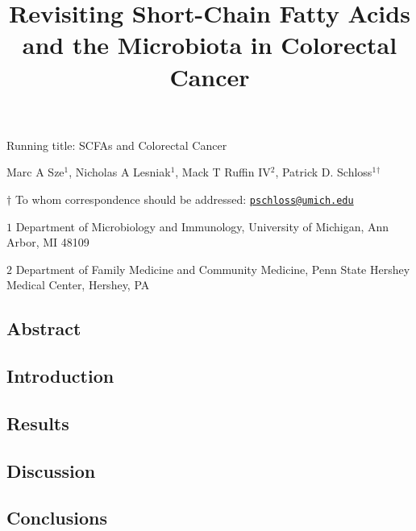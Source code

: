 \documentclass[11pt,]{article}
\title{Revisiting Short-Chain Fatty Acids and the Microbiota in Colorectal
Cancer}
\author{}
\date{}
\begin{document}
\maketitle

\vspace{35mm}

Running title: SCFAs and Colorectal Cancer

\vspace{35mm}

Marc A Sze\({^1}\), Nicholas A Lesniak\({^1}\), Mack T Ruffin
IV\({^2}\), Patrick D. Schloss\({^1}\)\({^\dagger}\)

\vspace{40mm}

\(\dagger\) To whom correspondence should be addressed:
\href{mailto:pschloss@umich.edu}{\nolinkurl{pschloss@umich.edu}}

\(1\) Department of Microbiology and Immunology, University of Michigan,
Ann Arbor, MI 48109

\(2\) Department of Family Medicine and Community Medicine, Penn State
Hershey Medical Center, Hershey, PA

\newpage

\linenumbers

\subsection{Abstract}\label{abstract}

\newpage

\subsection{Introduction}\label{introduction}

\newpage

\subsection{Results}\label{results}

\newpage

\subsection{Discussion}\label{discussion}

\newpage

\subsection{Conclusions}\label{conclusions}
\end{document}
